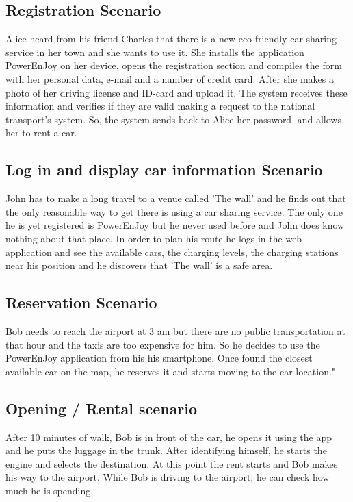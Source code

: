 \subsection {Registration Scenario}
Alice heard from his friend Charles that there is a new eco-friendly car sharing service in her town and she wants to use it. She installs the application PowerEnJoy on her device, opens the registration section and compiles the form with her personal data, e-mail and a number of credit card. After she makes a photo of her driving license and ID-card and upload it. The system receives these information and verifies if they are valid making a request to the national transport's system. So, the system sends back to Alice her password, and allows her to rent a car. 

\subsection{Log in and display car information Scenario}
John has to make a long travel to a venue called 'The wall' and he finds out that the only reasonable way to get there is using a car sharing service. The only one he is yet registered is PowerEnJoy but he never used before and John does know nothing about that place. In order to plan his route he logs in the web application and see the available cars, the charging levels, the charging stations near his position and he discovers that 'The wall' is a safe area. 
\subsection{Reservation Scenario}
Bob needs to reach the airport at 3 am but there are no public transportation at that hour and the taxis are too expensive for him. So he decides to use the PowerEnJoy application from his his smartphone. Once found the closest available car on the map, he reserves it and starts moving to the car location." 


\subsection{Opening / Rental scenario}
After 10 minutes of walk, Bob is in front of the car, he opens it using the app and he puts the luggage in the trunk. After identifying himself, he starts the engine and selects the destination. At this point the rent starts and Bob makes his way to the airport. 
While Bob is driving to the airport, he can check how much he is spending.
